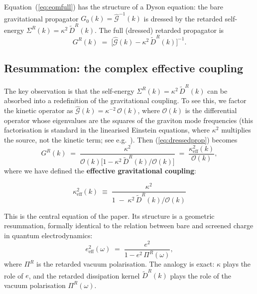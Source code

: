 \documentclass[12pt,a4paper]{article}
\begin{document}
Equation~(\ref{eq:eomfull}) has the structure of a Dyson equation: the bare gravitational propagator $G_{0}(k)=\hat{\mathcal{G}}^{-1}(k)$ is dressed by the retarded self-energy $\Sigma^{R}(k)=\kappa^{2}\,\tilde{D}^{R}(k)$.
The full (dressed) retarded propagator is
\begin{equation}\label{eq:dressedprop}
  G^{R}(k)
  \;=\;
  \bigl[\hat{\mathcal{G}}(k)-\kappa^{2}\,\tilde{D}^{R}(k)\bigr]^{-1}.
\end{equation}

\subsection{Resummation: the complex effective coupling}\label{sec:resum}

The key observation is that the self-energy $\Sigma^{R}(k)=\kappa^{2}\,\tilde{D}^{R}(k)$ can be absorbed into a redefinition of the gravitational coupling.
To see this, we factor the kinetic operator as $\hat{\mathcal{G}}(k)=\kappa^{-2}\,\mathcal{O}(k)$, where $\mathcal{O}(k)$ is the differential operator whose eigenvalues are the squares of the graviton mode frequencies (this factorisation is standard in the linearised Einstein equations, where $\kappa^{2}$ multiplies the source, not the kinetic term; see e.g.~\cite{HuVerdaguer2004}).
Then (\ref{eq:dressedprop}) becomes
\begin{equation}\label{eq:factor}
  G^{R}(k)
  \;=\;
  \frac{\kappa^{2}}{\mathcal{O}(k)\bigl[1-\kappa^{2}\,\tilde{D}^{R}(k)/\mathcal{O}(k)\bigr]}
  \;=\;
  \frac{\kappa_{\mathrm{eff}}^{2}(k)}{\mathcal{O}(k)},
\end{equation}
where we have defined the \textbf{effective gravitational coupling}:

\begin{equation}\label{eq:keff}
  \boxed{
  \kappa_{\mathrm{eff}}^{2}(k)
  \;\equiv\;
  \frac{\kappa^{2}}{1 \;-\; \kappa^{2}\,\tilde{D}^{R}(k)\big/\mathcal{O}(k)}
  }
\end{equation}

\medskip

\noindent
This is the central equation of the paper.
Its structure is a geometric resummation, formally identical to the relation between bare and screened charge in quantum electrodynamics:
\begin{equation}\label{eq:QEDanalogy}
  e_{\mathrm{eff}}^{2}(\omega)
  \;=\;
  \frac{e^{2}}{1-e^{2}\,\Pi^{R}(\omega)},
\end{equation}
where $\Pi^{R}$ is the retarded vacuum polarisation.
The analogy is exact: $\kappa$ plays the role of $e$, and the retarded dissipation kernel $\tilde{D}^{R}(k)$ plays the role of the vacuum polarisation $\Pi^{R}(\omega)$.
\end{document}
